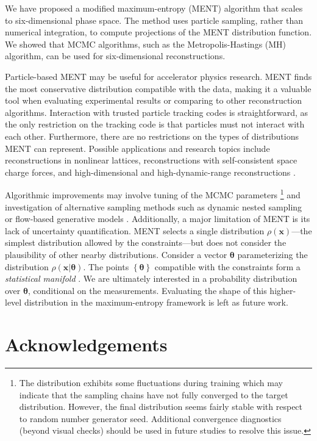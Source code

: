 \documentclass[%
    reprint,
    twocolumn,
    amsmath,
    amssymb,
    aps,
    prstab,
]{revtex4-2}
\begin{document}
We have proposed a modified maximum-entropy (MENT) algorithm that scales to six-dimensional phase space. The method uses particle sampling, rather than numerical integration, to compute projections of the MENT distribution function. We showed that MCMC algorithms, such as the Metropolis-Hastings (MH) algorithm, can be used for six-dimensional reconstructions.

Particle-based MENT may be useful for accelerator physics research. MENT finds the most conservative distribution compatible with the data, making it a valuable tool when evaluating experimental results or comparing to other reconstruction algorithms. Interaction with trusted particle tracking codes is straightforward, as the only restriction on the tracking code is that particles must not interact with each other. Furthermore, there are no restrictions on the types of distributions MENT can represent. Possible applications and research topics include reconstructions in nonlinear lattices, reconstructions with self-consistent space charge forces, and high-dimensional and high-dynamic-range reconstructions \cite{Hoover_2023}. 

Algorithmic improvements may involve tuning of the MCMC parameters \footnote{The distribution exhibits some fluctuations during training which may indicate that the sampling chains have not fully converged to the target distribution. However, the final distribution seems fairly stable with respect to random number generator seed. Additional convergence diagnostics (beyond visual checks) should be used in future studies to resolve this issue.} and investigation of alternative sampling methods such as dynamic nested sampling \cite{Higson_2019} or flow-based generative models \cite{Midgley_2022}. Additionally, a major limitation of MENT is its lack of uncertainty quantification. MENT selects a single distribution $\rho(\bm{x})$---the simplest distribution allowed by the constraints---but does not consider the plausibility of other nearby distributions. Consider a vector $\bm{\theta}$ parameterizing the distribution $\rho(\bm{x} | \bm{\theta})$. The points $\left \{ \bm{\theta} \right \}$ compatible with the constraints form a \textit{statistical manifold} \cite{Caticha_2021}. We are ultimately interested in a probability distribution over $\bm{\theta}$, conditional on the measurements. Evaluating the shape of this higher-level distribution in the maximum-entropy framework is left as future work.


\section{Acknowledgements}
\end{document}

